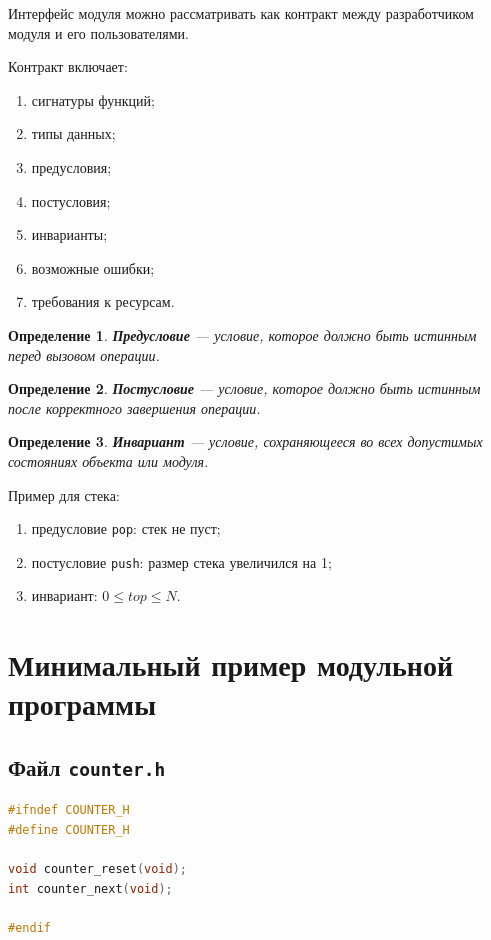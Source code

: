 \documentclass[12pt,a4paper]{article}
\newtheorem{definition}{Определение}
\begin{document}
Интерфейс модуля можно рассматривать как контракт между разработчиком модуля и его пользователями.

Контракт включает:
\begin{enumerate}
  \item сигнатуры функций;
  \item типы данных;
  \item предусловия;
  \item постусловия;
  \item инварианты;
  \item возможные ошибки;
  \item требования к ресурсам.
\end{enumerate}

\begin{definition}
\textbf{Предусловие} --- условие, которое должно быть истинным перед вызовом операции.
\end{definition}

\begin{definition}
\textbf{Постусловие} --- условие, которое должно быть истинным после корректного завершения операции.
\end{definition}

\begin{definition}
\textbf{Инвариант} --- условие, сохраняющееся во всех допустимых состояниях объекта или модуля.
\end{definition}

Пример для стека:
\begin{enumerate}
  \item предусловие \texttt{pop}: стек не пуст;
  \item постусловие \texttt{push}: размер стека увеличился на 1;
  \item инвариант: $0 \leq top \leq N$.
\end{enumerate}

\section{Минимальный пример модульной программы}

\subsection*{Файл \texttt{counter.h}}

\begin{lstlisting}[language=C]
#ifndef COUNTER_H
#define COUNTER_H

void counter_reset(void);
int counter_next(void);

#endif
\end{lstlisting}
\end{document}
